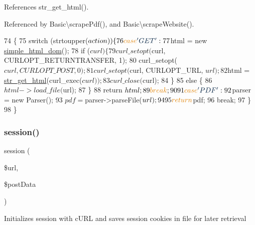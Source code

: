 References str\+\_\+get\+\_\+html().



Referenced by Basic\textbackslash{}scrape\+Pdf(), and Basic\textbackslash{}scrape\+Website().


\begin{DoxyCode}
74                                                            \{
75         \textcolor{keywordflow}{switch} (strtoupper($action)) \{
76             \textcolor{keywordflow}{case} \textcolor{stringliteral}{'GET'}:
77             $html = \textcolor{keyword}{new} \hyperlink{classsimple__html__dom}{simple\_html\_dom}();
78             \textcolor{keywordflow}{if} ($curl) \{
79                 curl\_setopt($curl, CURLOPT\_RETURNTRANSFER, 1); 
80                 curl\_setopt($curl, CURLOPT\_POST, 0);
81                 curl\_setopt($curl, CURLOPT\_URL, $url);
82                 $html = \hyperlink{simple__html__dom_8php_a2a9c7626f0cb0a56eb81709124a08922}{str\_get\_html}(curl\_exec($curl));
83                 curl\_close($curl);
84             \}
85             \textcolor{keywordflow}{else} \{
86                 $html->load\_file($url);
87             \}
88             \textcolor{keywordflow}{return} $html;
89             \textcolor{keywordflow}{break};
90             
91             \textcolor{keywordflow}{case} \textcolor{stringliteral}{'PDF'}:
92             $parser = \textcolor{keyword}{new} Parser();
93             $pdf = $parser->parseFile($url);
94 
95             \textcolor{keywordflow}{return} $pdf;
96             \textcolor{keywordflow}{break};
97         \}
98     \}
\end{DoxyCode}
\hypertarget{class_base_controller_a259a554926fc05640c8c711c340cdeac}{}\label{class_base_controller_a259a554926fc05640c8c711c340cdeac} 
\subsubsection{\texorpdfstring{session()}{session()}}
{\footnotesize\ttfamily session (\begin{DoxyParamCaption}\item[{}]{\$url,  }\item[{}]{\$post\+Data }\end{DoxyParamCaption})\hspace{0.3cm}{\ttfamily [protected]}}

Initializes session with c\+U\+RL and saves session cookies in file for later retrieval


